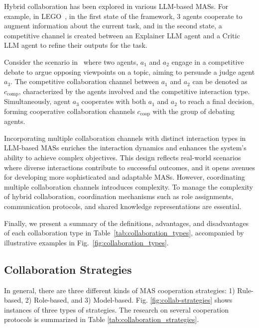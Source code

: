 \documentclass[acmsmall,nonacm]{acmart}
\begin{document}
            Hybrid collaboration has been explored in various LLM-based MASs. For example, in LEGO~\cite{he-etal-2023-lego}, in the first state of the framework, 3 agents cooperate to augment information about the current task, and in the second state, a competitive channel is created between an Explainer LLM agent and a Critic LLM agent to refine their outputs for the task. 
            
            Consider the scenario in~\cite{liang-etal-2024-encouraging} where two agents, $a_1$ and $a_2$ engage in a competitive debate to argue opposing viewpoints on a topic, aiming to persuade a judge agent $a_3$. The competitive collaboration channel between $a_1$ and $a_2$ can be denoted as $c_{\text{comp}}$, characterized by the agents involved and the competitive interaction type. Simultaneously, agent $a_3$ cooperates with both $a_1$ and $a_2$ to reach a final decision, forming cooperative collaboration channels $c_{\text{coop}}$ with the group of debating agents. 

            Incorporating multiple collaboration channels with distinct interaction types in LLM-based MASs enriches the interaction dynamics and enhances the system's ability to achieve complex objectives. This design reflects real-world scenarios where diverse interactions contribute to successful outcomes, and it opens avenues for developing more sophisticated and adaptable MASs. However, coordinating multiple collaboration channels introduces complexity. To manage the complexity of hybrid collaboration, coordination mechanisms such as role assignments, communication protocols, and shared knowledge representations are essential.

            Finally, we present a summary of the definitions, advantages, and disadvantages of each collaboration type in Table~\ref{tab:collaboration_types}, accompanied by illustrative examples in Fig.~\ref{fig:collaboration_types}.

    \subsection{Collaboration Strategies}
        In general, there are three different kinds of MAS cooperation strategies: 1) Rule-based, 2) Role-based, and 3) Model-based. Fig. \ref{fig:collab-strategies} shows instances of three types of strategies. The research on several cooperation protocols is summarized in Table \ref{tab:collaboration_strategies}. 
        
\end{document}
